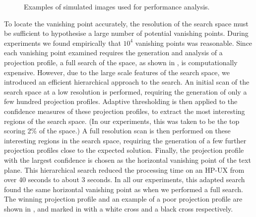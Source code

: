 \begin{comment}
The entropy measure $E(B)$ performed significantly worse in all the above
measures.  $S(B)$ and $S_d(B)$ always responded well with the $S(B)$ measure
deteriorating rapidly as the image became noisier. CHECK JOEY.  $S_d(B)$
responded best even in presence of noise and is also more efficient to compute.
The confidence of each of the vanishing points with regard to the binarised text
in \reffig{runbin} is plotted in \reffig{ppmap}, where darker pixels represent a
larger squared-sum, and a more likely vanishing point.
\end{comment}


\begin{figure}[t!]
\centering
\begin{center}
\end{center}
\vspace*{0mm}
\caption{Examples of simulated images used for performance analysis.}
\label{simimages}
\end{figure}

To locate the vanishing point accurately, the resolution of the
search space must be sufficient to hypothesise a large number of potential
vanishing points.  During experiments we found empirically that $10^4$
vanishing points was reasonable. Since each vanishing point examined requires
the generation and analysis of a projection profile, a full search of the
space, as shown in , is computationally expensive.  However, due
to the large scale features of the search space, we introduced an efficient
hierarchical approach to the search.  An initial scan of the search space at a
low resolution is performed, requiring the generation of only a few hundred
projection profiles.  Adaptive thresholding is then applied to the confidence
measures of these projection profiles, to extract the most interesting regions
of the search space.  (In our experiments, this was taken to be the top scoring
2\% of the space.) A full resolution scan is then performed on these
interesting regions in the search space, requiring the generation of a few
further projection profiles close to the expected solution.  Finally, the
projection profile with the largest confidence is chosen as the horizontal
vanishing point of the text plane.  
This hierarchical search reduced the processing time on an HP-UX from over 40
seconds to about 3 seconds. In all our experiments, this adapted search found
the same horizontal vanishing point as when we performed a full search.
The winning projection profile and an
example of a poor projection profile are shown in , and
marked in  with a white cross and a black cross respectively.

